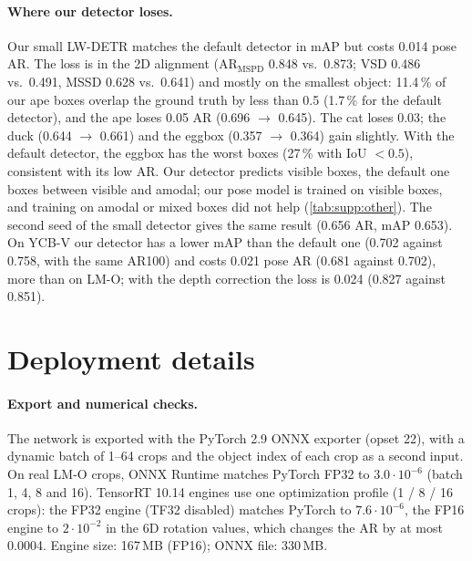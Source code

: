 \paragraph{Where our detector loses.}
Our small LW-DETR matches the default detector in mAP but costs 0.014 pose AR. The loss is in the 2D
alignment (AR$_\mathrm{MSPD}$ 0.848 vs.\ 0.873; VSD 0.486 vs.\ 0.491, MSSD 0.628 vs.\ 0.641) and
mostly on the smallest object: 11.4\,\% of our ape boxes overlap the ground truth by less than 0.5
(1.7\,\% for the default detector), and the ape loses 0.05 AR (0.696 $\rightarrow$ 0.645). The cat
loses 0.03; the duck (0.644 $\rightarrow$ 0.661) and the eggbox (0.357 $\rightarrow$ 0.364) gain
slightly. With the default detector, the eggbox has the worst boxes (27\,\% with IoU $< 0.5$),
consistent with its low AR. Our detector predicts visible boxes, the default one boxes between
visible and amodal; our pose model is trained on visible boxes, and training on amodal or mixed
boxes did not help (\cref{tab:supp:other}). The second seed of the small detector gives the same
result (0.656 AR, mAP 0.653). On YCB-V our detector has a lower mAP than the default one (0.702
against 0.758, with the same AR100) and costs 0.021 pose AR (0.681 against 0.702), more than on
LM-O; with the depth correction the loss is 0.024 (0.827 against 0.851).

\section{Deployment details}
\label{sec:supp:deploy}

\paragraph{Export and numerical checks.}
The network is exported with the PyTorch 2.9 ONNX exporter (opset 22), with a dynamic batch of
1--64 crops and the object index of each crop as a second input. On real LM-O crops, ONNX Runtime
matches PyTorch FP32 to $3.0 \cdot 10^{-6}$ (batch 1, 4, 8 and 16). TensorRT 10.14 engines use one
optimization profile (1 / 8 / 16 crops): the FP32 engine (TF32 disabled) matches PyTorch to
$7.6 \cdot 10^{-6}$, the FP16 engine to $2 \cdot 10^{-2}$ in the 6D rotation values, which changes
the AR by at most 0.0004. Engine size: 167\,MB (FP16); ONNX file: 330\,MB.

